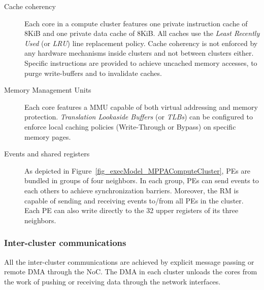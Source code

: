 \documentclass[main.tex]{subfiles}
\begin{document}
\begin{description}
    \item[Cache coherency]
        Each core in a compute cluster features one private instruction cache
        of 8KiB and one private data cache of 8KiB. All caches use the
        \emph{Least Recently Used} (or \emph{LRU}) line replacement policy.
        Cache coherency is not enforced by any hardware mechanisms inside
        clusters and not between clusters either. Specific instructions are
        provided to achieve uncached memory accesses, to purge write-buffers
        and to invalidate caches.

    \item[Memory Management Units]
        Each core features a MMU capable of both virtual addressing and memory
        protection. \emph{Translation Lookaside Buffers} (or \emph{TLBs}) can
        be configured to enforce local caching policies (Write-Through or
        Bypass) on specific memory pages.


    \item[Events and shared registers]
        As depicted in Figure~\ref{fig_execModel_MPPAComputeCluster}, PEs are
        bundled in groups of four neighbors. In each group, PEs can send events
        to each others to achieve synchronization barriers. Moreover, the RM is
        capable of sending and receiving events to/from all PEs in the cluster.
        Each PE can also write directly to the 32 upper registers of its three neighbors. 
\end{description}


\subsubsection{Inter-cluster communications}
All the inter-cluster communications are achieved by explicit message passing
or remote DMA through the NoC. The DMA in each cluster unloads the cores from
the work of pushing or receiving data through the network interfaces. 
\end{document}
